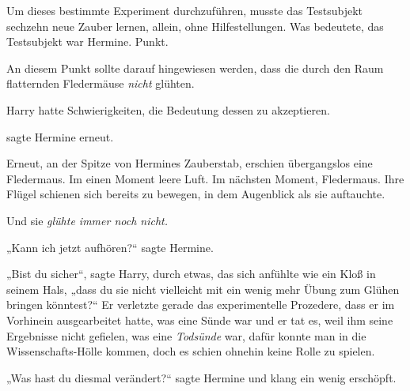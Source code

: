 Um dieses bestimmte Experiment durchzuführen, musste das Testsubjekt sechzehn neue Zauber lernen, allein, ohne Hilfestellungen. Was bedeutete, das Testsubjekt war Hermine. Punkt.

An diesem Punkt sollte darauf hingewiesen werden, dass die durch den Raum flatternden Fledermäuse \emph{nicht} glühten.

Harry hatte Schwierigkeiten, die Bedeutung dessen zu akzeptieren.

 sagte Hermine erneut.

Erneut, an der Spitze von Hermines Zauberstab, erschien übergangslos eine Fledermaus. Im einen Moment leere Luft. Im nächsten Moment, Fledermaus. Ihre Flügel schienen sich bereits zu bewegen, in dem Augenblick als sie auftauchte.

Und sie \emph{glühte immer noch nicht.}

„Kann ich jetzt aufhören?“ sagte Hermine.

„Bist du sicher“, sagte Harry, durch etwas, das sich anfühlte wie ein Kloß in seinem Hals, „dass du sie nicht vielleicht mit ein wenig mehr Übung zum Glühen bringen könntest?“ Er verletzte gerade das experimentelle Prozedere, dass er im Vorhinein ausgearbeitet hatte, was eine Sünde war und er tat es, weil ihm seine Ergebnisse nicht gefielen, was eine \emph{Todsünde} war, dafür konnte man in die Wissenschafts-Hölle kommen, doch es schien ohnehin keine Rolle zu spielen.

„Was hast du diesmal verändert?“ sagte Hermine und klang ein wenig erschöpft.

